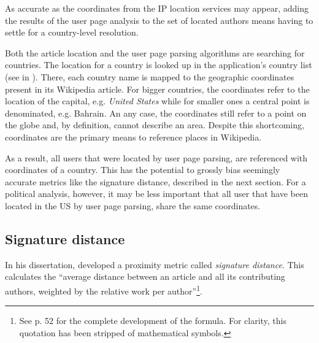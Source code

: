 As accurate as the coordinates from the \ac{IP} location services may appear, adding the results of the user page analysis to the set of located authors means having to settle for a country-level resolution.

Both the article location and the user page parsing algorithms are searching for countries.
The location for a country is looked up in the application's country list (see  in ).
There, each country name is mapped to the geographic coordinates present in its Wikipedia article.
For bigger countries, the coordinates refer to the location of the capital, e.g. \emph{United States} while for smaller ones a central point is denominated, e.g. Bahrain.
An any case, the coordinates still refer to a point on the globe and, by definition, cannot describe an area.
Despite this shortcoming, coordinates are the primary means to reference places in Wikipedia.

As a result, all users that were located by user page parsing, are referenced with coordinates of a country.
This has the potential to grossly bias seemingly accurate metrics like the signature distance, described in the next section.
For a political analysis, however, it may be less important that all user that have been located in the US by user page parsing, share the same coordinates.

\subsection{Signature distance}

In his dissertation, \textcite{hardy2011volunteered} developed a proximity metric called \emph{signature distance}.
This calculates the ``average distance between an article and all its contributing authors, weighted by the relative work
per author''\footnote{See p. 52 for the complete development of the formula. For clarity, this quotation has been stripped of mathematical symbols.}.

